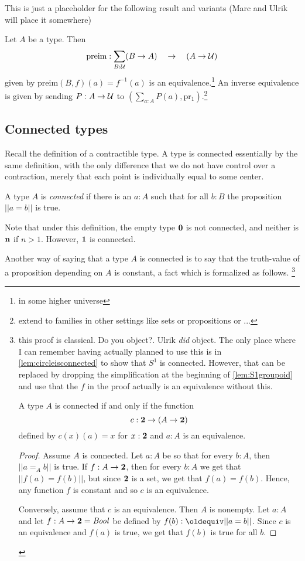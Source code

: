 This is just a placeholder for the following result and variants (Marc and Ulrik will place it somewhere)
\begin{lemma}
\label{lem:typefamiliesandfibrations}
  Let $A$ be a type.  Then
$$\mathrm{preim}:\sum_{B:\mathcal{U}}(B\to A)\quad\to\quad (A\to\mathcal{U}) 
$$ 
given by $\mathrm{preim}(B,f)(a)=f^{-1}(a)$ is an equivalence.\footnote{in some higher universe}
An inverse equivalence is given by sending $P:A\to\mathcal{U}$ to $(\sum_{a:A}P(a), \mathrm{pr_1})$.\footnote{extend to families in other settings like sets or propositions or ...}
\end{lemma}


\subsection{Connected types}
\label{sec:connectedtypes}
Recall the definition of a contractible type.  A type is connected essentially by the same definition, with the only difference that we do not have control over a contraction, merely that each point is individually equal to some center.
\begin{definition}\label{def:connected}
A type $A$ is \emph{connected} if there is an $a:A$ such that for all $b:B$ the proposition $||a=b||$ is true.  
\end{definition}
Note that under this definition, the empty type $\mathbf{0} $ is not connected, and neither is $\mathbf{n} $ if $n>1$. However, $\mathbf{1} $ is connected.

Another way of saying that a type $A$ is connected is to say that the truth-value of a proposition depending on $A$ is constant, a fact which is formalized as follows.
\footnote{this proof is classical.  Do you object?.   Ulrik \emph{did} object.  
The only place where I can remember having actually planned to use  this is in \cref{lem:circleisconnected} to show that $S^1$ is connected.  However, that can be replaced by dropping the simplification at the beginning of  \cref{lem:S1groupoid} and use that the $f$ in the proof actually is an equivalence without this. 

\begin{lemma}
  \label{lem:classicalconnected}
  A type $A$ is connected if and only if the function 
$$c:\mathbf{2} \to(A\to\mathbf{2} )$$ defined by $c(x)(a)=x$ for $x:\mathbf{2} $ and $a:A$ 
is an equivalence. 
\end{lemma}
  \begin{proof}    
    Assume $A$ is connected.  Let $a:A$ be so that for every $b:A$, then $||a=_Ab||$ is true.  If $f:A\to\mathbf{2} $, then for every $b:A$ we get that $||f(a)=f(b)||$, but since $\mathbf{2} $ is a set, we get that $f(a)=f(b)$.  Hence, any function $f$ is constant and so $c$ is an equivalence.

Conversely, assume that $c$ is an equivalence.  Then $A$ is nonempty.  Let $a:A$ and let $f:A\to \mathbf{2} =\mathop{\mathit{Bool}}$ be defined by $f(b)\defequi||a=b||$.  Since $c$ is an equivalence and $f(a)$ is true, we get that $f(b)$ is true for all $b$.   
  \end{proof}
}

